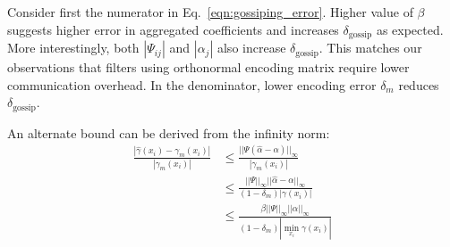 \documentclass[10pt,letterpaper,final]{article}
\begin{document}
Consider first the numerator in Eq.~\eqref{eqn:gossiping_error}. Higher value of $\beta$ suggests higher error in aggregated coefficients and increases $\delta_{\text{gossip}}$ as expected. More interestingly, both $|\Psi_{ij}|$ and $|\alpha_j|$ also increase $\delta_{\text{gossip}}$. This matches our observations that filters using orthonormal encoding matrix require lower communication overhead. In the denominator, lower encoding error $\delta_m$ reduces $\delta_{\text{gossip}}$. 

An alternate bound can be derived from the infinity norm:
\begin{align}
\frac{|\hat{\gamma}(x_i)-\gamma_m(x_i)|}{|\gamma_m(x_i)|} &\leq \frac{||\Psi (\hat{\alpha}-\alpha) ||_\infty}{|\gamma_m(x_i)|} \nonumber \\
&\leq \frac{||\Psi||_\infty ||\hat{\alpha}-\alpha ||_\infty}{(1-\delta_m)|\gamma(x_i)|} \nonumber \\
&\leq \frac{\beta ||\Psi||_\infty ||\alpha ||_\infty}{(1-\delta_m)|\min_{x_i}\gamma(x_i)|} \nonumber
\label{eqn:gossiping_error2}
\end{align}



\end{document}
